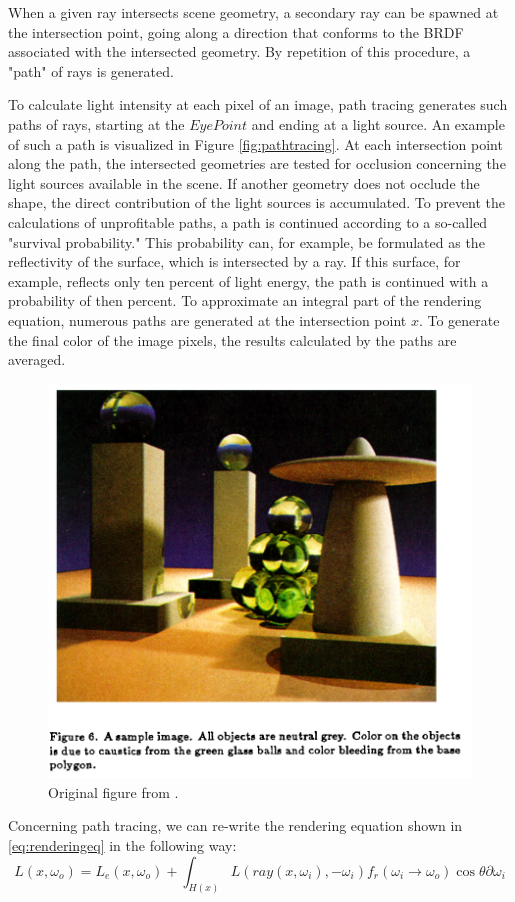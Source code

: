 When a given ray intersects scene geometry, a secondary ray can be spawned at the intersection point, going along a direction that conforms to the BRDF associated with the intersected geometry. By repetition of this procedure, a "path" of rays is generated.

To calculate light intensity at each pixel of an image, path tracing generates such paths of rays, starting at the $Eye Point$ and ending at a light source. An example of such a path is visualized in Figure \ref{fig:pathtracing}. At each intersection point along the path, the intersected geometries are tested for occlusion concerning the light sources available in the scene. If another geometry does not occlude the shape, the direct contribution of the light sources is accumulated.
To prevent the calculations of unprofitable paths, a path is continued according to a so-called "survival probability." This probability can, for example,  be formulated as the reflectivity of the surface, which is intersected by a ray. If this surface, for example, reflects only ten percent of light energy, the path is continued with a probability of then percent.
To approximate an integral part of the rendering equation, numerous paths are generated at the intersection point $x$. To generate the final color of the image pixels, the results calculated by the paths are averaged.

\begin{figure}
	\centering
	\includegraphics[width=.7\linewidth]{img/1 fundamentals/rendering_eq_figure.png}
	\caption{Original figure from \cite{kajiya1986rendering}.}
	\label{fig:kajiya_figure}
\end{figure}

Concerning path tracing, we can re-write the rendering equation shown in \ref{eq:renderingeq} in the following way:
\begin{equation}\label{eq:renderingeq_update}
L(x, \omega_{o}) = L_{e}(x, \omega_{o}) + \int_{H(x)} L(ray(x, \omega_{i}), -\omega_{i})f_{r}(\omega_{i} \rightarrow \omega_{o})\cos\theta\partial\omega_{i}
\end{equation}

